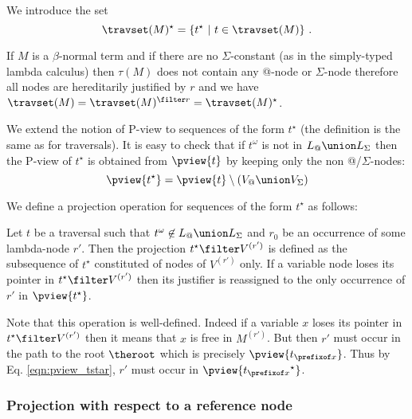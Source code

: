 We introduce the set
$$\travset(M)^\star = \{ t^\star \ | \  t \in \travset(M) \} \ .$$

\begin{remark}
If $M$ is a $\beta$-normal term and if there are no
$\Sigma$-constant (as in the simply-typed lambda calculus) then
$\tau(M)$ does not contain any @-node or $\Sigma$-node therefore all
nodes are hereditarily justified by $r$ and we have $\travset(M) =
\travset(M)^{\filter r} = \travset(M)^\star$.
\end{remark}


We extend the notion of P-view to sequences of the form $t^\star$
(the definition is the same as for traversals). It is easy to check
that if $t^\omega$ is not in $L_@ \union L_\Sigma$ then the P-view
of $t^\star$ is obtained from $\pview{t}$ by keeping only the non
@/$\Sigma$-nodes:
\begin{equation}
 \pview{t^\star} = \pview{t} \setminus (V_@ \union V_\Sigma) \label{eqn:pview_tstar}
\end{equation}

We define a projection operation for sequences of the form $t^\star$
as follows:
\begin{definition}
\label{def:subterm_trav_projection}
  Let $t$ be a traversal such that $t^\omega\not\in L_@ \union L_\Sigma$ and $r_0$ be an occurrence of some
lambda-node $r'$. Then the projection $t^\star \filter V^{(r')}$ is
defined as the subsequence of $t^\star$ constituted of nodes of
$V^{(r')}$ only. If a variable node loses its pointer in $t^\star
\filter V^{(r')}$ then its justifier is reassigned to the only
occurrence of $r'$ in $\pview{t^\star}$.
\end{definition}
Note that this operation is well-defined. Indeed if a variable $x$
loses its pointer in $t^\star \filter V^{(r')}$ then it means that
$x$ is free in $M^{(r')}$. But then $r'$ must occur in the path to
the root $\theroot$ which is precisely $\pview{t_{\prefixof x}}$.
Thus by Eq. \ref{eqn:pview_tstar}, $r'$ must occur in
$\pview{{t_{\prefixof x}}^\star}$.



\subsubsection{Projection with respect to a reference node}
\label{sec:tstar}

